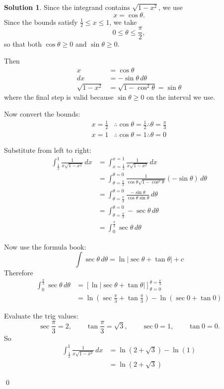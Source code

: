 \documentclass[a4paper]{article}
\theoremstyle{plain}
\theoremstyle{definition}
\newtheorem*{solution}{Solution}
\numberwithin{equation}{subsection}
\begin{document}
\begin{solution}

Since the integrand contains $\sqrt{1-x^2}$, we use
\[
    x = \cos \theta.
\]
Since the bounds satisfy $\frac{1}{2}\leq x \leq 1$, we take
\[
    0 \leq \theta \leq \frac{\pi}{2},
\]
so that both $\cos\theta \geq 0$ and $\sin\theta \geq 0$.

Then
\begin{align*}
    x &= \cos \theta\\
    dx &= -\sin \theta\,d\theta\\
    \sqrt{1-x^2} &= \sqrt{1-\cos^2\theta} = \sin \theta
\end{align*}
where the final step is valid because $\sin \theta \geq 0$ on the interval we use.

Now convert the bounds:
\begin{align*}
    x = \frac{1}{2} &\therefore \cos \theta = \frac{1}{2} \therefore \theta = \frac{\pi}{3}\\
    x = 1 &\therefore \cos \theta = 1 \therefore \theta = 0
\end{align*}

Substitute from left to right:
\begin{align*}
    \int_{\frac{1}{2}}^{1}\frac{1}{x\sqrt{1-x^2}}\,dx
    &= \int_{x=\frac{1}{2}}^{x=1}\frac{1}{x\sqrt{1-x^2}}\,dx\\
    &= \int_{\theta=\frac{\pi}{3}}^{\theta=0}\frac{1}{\cos\theta\sqrt{1-\cos^2\theta}}(-\sin\theta)\,d\theta\\
    &= \int_{\theta=\frac{\pi}{3}}^{\theta=0}\frac{-\sin\theta}{\cos\theta\sin\theta}\,d\theta\\
    &= \int_{\theta=\frac{\pi}{3}}^{\theta=0}-\sec\theta\,d\theta\\
    &= \int_{0}^{\frac{\pi}{3}}\sec\theta\,d\theta
\end{align*}

Now use the formula book:
\[
    \int \sec\theta\,d\theta = \ln|\sec\theta + \tan\theta| + c
\]
Therefore
\begin{align*}
    \int_{0}^{\frac{\pi}{3}}\sec\theta\,d\theta
    &= \left[\ln|\sec\theta + \tan\theta|\right]_{\theta=0}^{\theta=\frac{\pi}{3}}\\
    &= \ln\left(\sec\frac{\pi}{3} + \tan\frac{\pi}{3}\right) - \ln(\sec 0 + \tan 0)
\end{align*}

Evaluate the trig values:
\[
    \sec\frac{\pi}{3} = 2, \qquad \tan\frac{\pi}{3} = \sqrt{3}, \qquad \sec 0 = 1, \qquad \tan 0 = 0.
\]
So
\begin{align*}
    \int_{\frac{1}{2}}^{1}\frac{1}{x\sqrt{1-x^2}}\,dx
    &= \ln(2+\sqrt{3}) - \ln(1)\\
    &= \ln(2+\sqrt{3})
\end{align*}

\qed
\end{solution}
\end{document}
